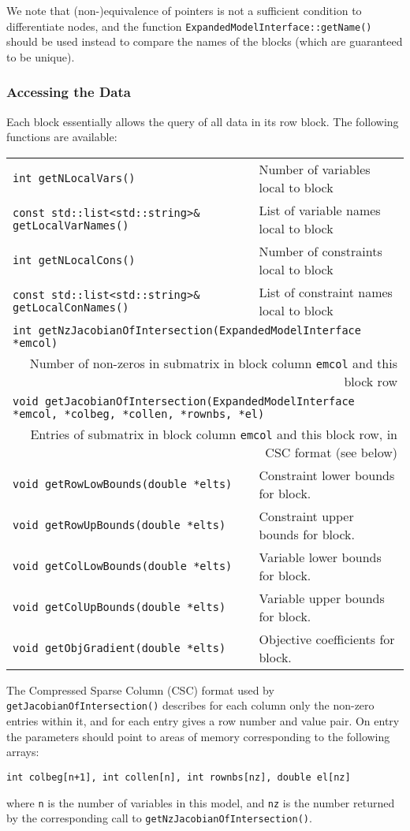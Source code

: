 \documentclass[10pt,a4paper]{book}
\begin{document}
We note that (non-)equivalence of pointers is not a sufficient condition to
differentiate nodes, and the function {\tt ExpandedModelInterface::getName()}
should be used instead to compare the names of the blocks (which are
guaranteed to be unique).

\subsubsection{Accessing the Data}
Each block essentially allows the query of all data in its row block. The
following functions are available:
\begin{center}
\begin{tabular}{ll}
{\tt int getNLocalVars()} & 
   Number of variables local to block \\
{\tt const std::list<std::string>\& getLocalVarNames()} &
   List of variable names local to block \\
{\tt int getNLocalCons()} & 
   Number of constraints local to block \\
{\tt const std::list<std::string>\& getLocalConNames()} &
   List of constraint names local to block \\
\multicolumn{2}{l}{\tt int getNzJacobianOfIntersection(ExpandedModelInterface *emcol)}\\
\multicolumn{2}{r}{Number of non-zeros in submatrix in block column {\tt emcol}
   and this block row} \\
\multicolumn{2}{l}{\tt void getJacobianOfIntersection(ExpandedModelInterface *emcol,
      *colbeg, *collen, *rownbs, *el)} \\
\multicolumn{2}{r}{Entries of submatrix in block column {\tt emcol} and this
   block row, in CSC format (see below)} \\
{\tt void getRowLowBounds(double *elts)} &
   Constraint lower bounds for block. \\
{\tt void getRowUpBounds(double *elts)} &
   Constraint upper bounds for block. \\
{\tt void getColLowBounds(double *elts)} &
   Variable lower bounds for block. \\
{\tt void getColUpBounds(double *elts)} &
   Variable upper bounds for block. \\
{\tt void getObjGradient(double *elts)} &
   Objective coefficients for block.
\end{tabular}
\end{center}

The Compressed Sparse Column (CSC) format used by 
{\tt getJacobianOfIntersection()} describes for each column only the non-zero
entries within it, and for each entry gives a row number and value pair. On
entry the parameters should point to areas of memory corresponding to the
following arrays: 
\begin{center}
{\tt int colbeg[n+1], int collen[n], int rownbs[nz], double el[nz]}
\end{center}
 where {\tt n} is the number of variables in this model, and
{\tt nz} is the number returned by the corresponding call to
{\tt getNzJacobianOfIntersection()}.
\end{document}
